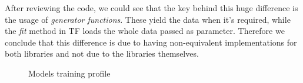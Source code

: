 After reviewing the code, we could see that the key behind this huge difference is the usage of \textit{generator functions}. These yield the data when it's required, while the \textit{fit} method in TF loads the whole data passed as parameter. Therefore we conclude that this difference is due to having non-equivalent implementations for both libraries and not due to the libraries themselves.


\begin{figure}[!htb]
    \hfill
    
    \hfill
    \caption{Models training profile}
\end{figure}

